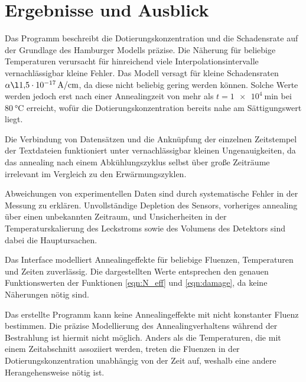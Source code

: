 \chapter{Ergebnisse und Ausblick}
Das Programm beschreibt die Dotierungskonzentration und die Schadensrate
auf der Grundlage des Hamburger Modells präzise. Die Näherung für beliebige
Temperaturen verursacht für hinreichend viele Interpolationsintervalle
vernachlässigbar kleine Fehler. Das Modell versagt für kleine Schadensraten $\alpha \l \SI{1.5e-17}{\ampere\per\centi\meter}$,
da diese nicht beliebig gering werden können. Solche Werte werden jedoch erst nach
einer Annealingzeit von mehr als $t=\SI{1e4}{\minute}$ bei $\SI{80}{\celsius}$ erreicht, wofür
die Dotierungskonzentration bereits nahe am Sättigungswert liegt.

Die Verbindung von Datensätzen und die Anknüpfung der einzelnen Zeitstempel der
Textdateien funktioniert unter vernachlässigbar kleinen Ungenauigkeiten, da das annealing
nach einem Abkühlungszyklus selbst über große Zeiträume irrelevant im Vergleich zu
den Erwärmungszyklen.

Abweichungen von experimentellen Daten sind durch systematische Fehler in der Messung
zu erklären. Unvollständige Depletion des Sensors, vorheriges annealing über einen
unbekannten Zeitraum, und Unsicherheiten in der Temperaturskalierung des Leckstroms sowie
des Volumens des Detektors sind dabei die Hauptursachen.

Das Interface modelliert Annealingeffekte für beliebige Fluenzen, Temperaturen und
Zeiten zuverlässig. Die dargestellten Werte entsprechen den genauen Funktionswerten
der Funktionen \ref{eqn:N_eff} und \ref{eqn:damage}, da keine Näherungen nötig sind.


Das erstellte Programm kann keine Annealingeffekte mit nicht konstanter Fluenz
bestimmen. Die präzise Modellierung des Annealingverhaltens während der Bestrahlung
ist hiermit nicht möglich. Anders als die Temperaturen, die mit einem Zeitabschnitt
assoziiert werden, treten die Fluenzen in der Dotierungskonzentration
unabhängig von der Zeit auf, weshalb eine andere Herangehensweise nötig ist.

